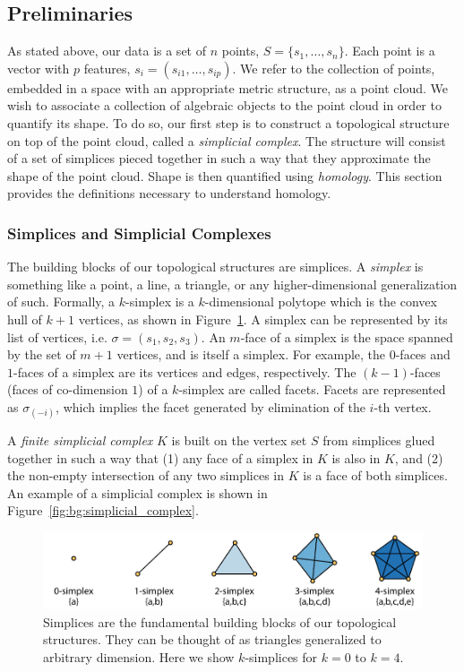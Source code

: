 \subsection{Preliminaries}
\label{bg:tda:math}

As stated above, our data is a set of $n$ points, $S=\{s_1,\ldots,s_n\}$.
Each point is a vector with $p$ features, $s_i=(s_{i1},\ldots,s_{ip})$.
We refer to the collection of points, embedded in a space with an appropriate metric structure, as a point cloud.
We wish to associate a collection of algebraic objects to the point cloud in order to quantify its shape.
To do so, our first step is to construct a topological structure on top of the point cloud, called a \emph{simplicial complex}.
The structure will consist of a set of simplices pieced together in such a way that they approximate the shape of the point cloud.
Shape is then quantified using \emph{homology}.
This section provides the definitions necessary to understand homology.

\subsubsection{Simplices and Simplicial Complexes}
\label{bg:tda:math:simplices}

The building blocks of our topological structures are simplices.
A \emph{simplex} is something like a point, a line, a triangle, or any higher-dimensional generalization of such.
Formally, a $k$-simplex is a $k$-dimensional polytope which is the convex hull of $k+1$ vertices, as shown in Figure~\ref{fig:bg:simplices}.
A simplex can be represented by its list of vertices, i.e. $\sigma=(s_{1},s_{2},s_{3})$.
An $m$-face of a simplex is the space spanned by the set of $m+1$ vertices, and is itself a simplex.
For example, the $0$-faces and $1$-faces of a simplex are its vertices and edges, respectively.
The $(k-1)$-faces (faces of co-dimension $1$) of a $k$-simplex are called facets.
Facets are represented as $\sigma_{(-i)}$, which implies the facet generated by elimination of the $i$-th vertex.

A \emph{finite simplicial complex} $K$ is built on the vertex set $S$ from simplices glued together in such a way that (1) any face of a simplex in $K$ is also in $K$, and (2) the non-empty intersection of any two simplices in $K$ is a face of both simplices.
An example of a simplicial complex is shown in Figure~\ref{fig:bg:simplicial_complex}.

\begin{figure}
\centering
\includegraphics[]{./fig/background/simplices.pdf}
\caption[Simplices: The building blocks of topological complexes]{Simplices are the fundamental building blocks of our topological structures. They can be thought of as triangles generalized to arbitrary dimension. Here we show $k$-simplices for $k=0$ to $k=4$.}
\label{fig:bg:simplices}
\end{figure}

